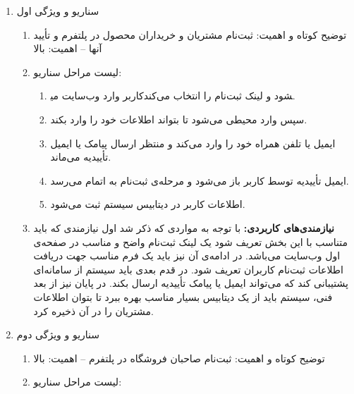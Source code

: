 \documentclass[]{article}
\begin{document}
\begin{enumerate}
\def\labelenumi{\arabic{enumi}.}
\item
  سناریو و ویژگی اول

  \begin{enumerate}
  \def\labelenumii{\arabic{enumii}.}
  \item
    توضیح کوتاه و اهمیت: ثبت‌نام مشتریان و خریداران محصول در پلتفرم و
    تأیید آنها -- اهمیت: بالا
  \item
    لیست مراحل سناریو:

    \begin{enumerate}
    \def\labelenumiii{\arabic{enumiii}.}
    \item
      کاربر وارد وب‌سایت می‎شود و لینک ثبت‌نام را انتخاب می‌کند.
    \item
      سپس وارد محیطی می‌شود تا بتواند اطلاعات خود را وارد بکند.
    \item
      ایمیل یا تلفن همراه خود را وارد می‌کند و منتظر ارسال پیامک یا
      ایمیل تأییدیه می‌ماند.
    \item
      ایمیل تأییدیه توسط کاربر باز می‌شود و مرحله‌ی ثبت‌نام به اتمام
      می‌رسد.
    \item
      اطلاعات کاربر در دیتابیس سیستم ثبت می‌شود.
    \end{enumerate}
  \item
    \textbf{نیازمندی‌های کاربردی:} با توجه به مواردی که ذکر شد اول
    نیازمندی که باید متناسب با این بخش تعریف شود یک لینک ثبت‌نام واضح و
    مناسب در صفحه‌ی اول وب‌سایت می‌باشد. در ادامه‌ی آن نیز باید یک فرم
    مناسب جهت دریافت اطلاعات ثبت‌نام کاربران تعریف شود. در قدم بعدی باید
    سیستم از سامانه‌ای پشتیبانی کند که می‌تواند ایمیل یا پیامک تأییدیه
    ارسال بکند. در پایان نیز از بعد فنی، سیستم باید از یک دیتابیس بسیار
    مناسب بهره ببرد تا بتوان اطلاعات مشتریان را در آن ذخیره کرد.
  \end{enumerate}
\item
  سناریو و ویژگی دوم

  \begin{enumerate}
  \def\labelenumii{\arabic{enumii}.}
  \item
    توضیح کوتاه و اهمیت: ثبت‌نام صاحبان فروشگاه در پلتفرم -- اهمیت: بالا
  \item
    لیست مراحل سناریو:


\end{enumerate}
\end{enumerate}
\end{document}
